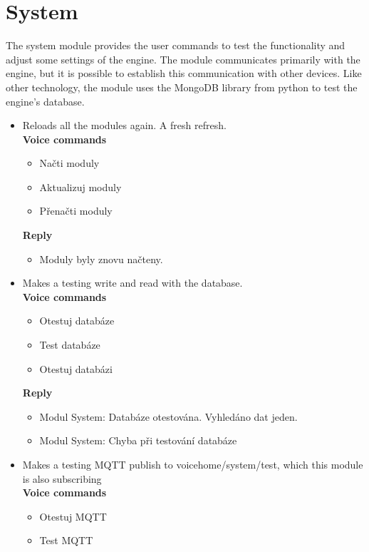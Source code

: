 \section{System}

The system module provides the user commands to test the functionality and adjust some settings of the engine. The module communicates primarily with the engine, but it is possible to establish this communication with other devices. Like other technology, the module uses the MongoDB library from python to test the engine's database.

\begin{itemize}
    \item Reloads all the modules again. A fresh refresh.\\
    \textbf{Voice commands}
    \begin{itemize}
        \item Načti moduly
        \item Aktualizuj moduly
        \item Přenačti moduly
    \end{itemize}
    \textbf{Reply}
    \begin{itemize}
        \item Moduly byly znovu načteny.
    \end{itemize}
    \item Makes a testing write and read with the database.\\
    \textbf{Voice commands}
    \begin{itemize}
        \item Otestuj databáze
        \item Test databáze
        \item Otestuj databázi
    \end{itemize}
    \textbf{Reply}
    \begin{itemize}
        \item Modul System: Databáze otestována. Vyhledáno dat jeden.
        \item Modul System: Chyba při testování databáze
    \end{itemize}
    \item Makes a testing MQTT publish to voicehome/system/test, which this module is also subscribing\\
    \textbf{Voice commands}
    \begin{itemize}
        \item Otestuj MQTT
        \item Test MQTT

\end{itemize}
\end{itemize}
